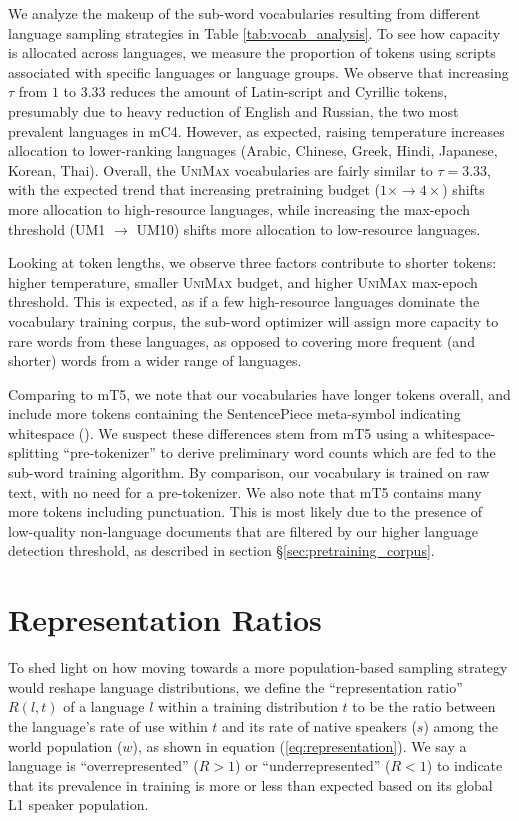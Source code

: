 \documentclass{article} %
\newcommand{\unimax}{\textsc{UniMax}}
\begin{document}
We analyze the makeup of the sub-word vocabularies resulting from different language sampling strategies in Table \ref{tab:vocab_analysis}.  To see how capacity is allocated across languages, we measure the proportion of tokens using scripts associated with specific languages or language groups.  We observe that increasing $\tau$ from $1$ to $3.33$ reduces the amount of Latin-script and Cyrillic tokens, presumably due to heavy reduction of English and Russian, the two most prevalent languages in mC4.  However, as expected, raising temperature increases allocation to lower-ranking languages (Arabic, Chinese, Greek,  Hindi, Japanese, Korean, Thai).  Overall, the \unimax{} vocabularies are fairly similar to $\tau=3.33$, with the expected trend that increasing pretraining budget ($1\times \rightarrow 4\times$) shifts more allocation to high-resource languages, while increasing the max-epoch threshold (UM1 $\rightarrow$ UM10) shifts more allocation to low-resource languages.

Looking at token lengths, we observe three factors contribute to shorter tokens: higher temperature, smaller \unimax{} budget, and higher \unimax{} max-epoch threshold.  This is expected, as if a few high-resource languages dominate the vocabulary training corpus, the sub-word optimizer will assign more capacity to rare words from these languages, as opposed to covering more frequent (and shorter) words from a wider range of languages.

Comparing to mT5, we note that our vocabularies have longer tokens overall, and include more tokens containing the SentencePiece meta-symbol indicating whitespace (\underline{\hspace{0.7em}}).  We suspect these differences stem from mT5 using a whitespace-splitting ``pre-tokenizer'' to derive preliminary word counts which are fed to the sub-word training algorithm.  By comparison, our vocabulary is trained on raw text, with no need for a pre-tokenizer.  We also note that mT5 contains many more tokens including punctuation.  This is most likely due to the presence of low-quality non-language documents that are filtered by our higher language detection threshold, as described in section \S\ref{sec:pretraining_corpus}.

\section{Representation Ratios} \label{sec:representation}

To shed light on how moving towards a more population-based sampling strategy would reshape language distributions, we define the ``representation ratio'' $R(l, t)$ of a language $l$ within a training distribution $t$ to be the ratio between the language's rate of use within $t$ and its rate of native speakers ($s$) among the world population ($w$), as shown in equation (\ref{eq:representation}). We say a language is ``overrepresented'' ($R > 1$) or ``underrepresented'' ($R < 1$) to indicate that its prevalence in training is more or less than expected based on its global L1 speaker population.
\end{document}
